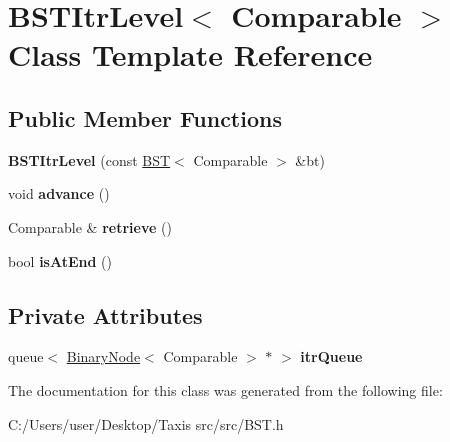 \hypertarget{class_b_s_t_itr_level}{}\section{B\+S\+T\+Itr\+Level$<$ Comparable $>$ Class Template Reference}
\label{class_b_s_t_itr_level}
\subsection*{Public Member Functions}
\begin{DoxyCompactItemize}
\item 
\mbox{\label{class_b_s_t_itr_level_a8fd5cdde93eb182c4cd5cf6b2c5efaeb}} 
{\bfseries B\+S\+T\+Itr\+Level} (const \hyperlink{class_b_s_t}{B\+ST}$<$ Comparable $>$ \&bt)
\item 
\mbox{\label{class_b_s_t_itr_level_ad54a6fa289a59d6050b507abe40d463b}} 
void {\bfseries advance} ()
\item 
\mbox{\label{class_b_s_t_itr_level_a0340bd9f21f72ae25348f383e67e7f91}} 
Comparable \& {\bfseries retrieve} ()
\item 
\mbox{\label{class_b_s_t_itr_level_a89bc8e81dde255fd6bad917cacc0d489}} 
bool {\bfseries is\+At\+End} ()
\end{DoxyCompactItemize}
\subsection*{Private Attributes}
\begin{DoxyCompactItemize}
\item 
\mbox{\label{class_b_s_t_itr_level_a6de8f9f3e129e2a358b00ffa35abcb0e}} 
queue$<$ \hyperlink{class_binary_node}{Binary\+Node}$<$ Comparable $>$ $\ast$ $>$ {\bfseries itr\+Queue}
\end{DoxyCompactItemize}


The documentation for this class was generated from the following file\+:\begin{DoxyCompactItemize}
\item 
C\+:/\+Users/user/\+Desktop/\+Taxis src/src/B\+S\+T.\+h\end{DoxyCompactItemize}
